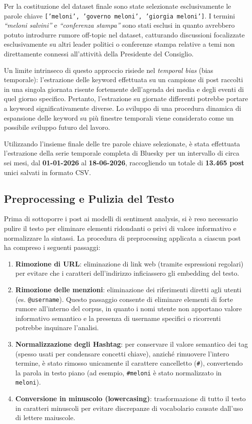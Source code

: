\documentclass[11pt]{article}
\begin{document}
Per la costituzione del dataset finale sono state selezionate esclusivamente le parole chiave \texttt{['meloni', 'governo meloni', 'giorgia meloni']}. I termini \textit{``meloni salvini''} e \textit{``conferenza stampa''} sono stati esclusi in quanto avrebbero potuto introdurre rumore off-topic nel dataset, catturando discussioni focalizzate esclusivamente su altri leader politici o conferenze stampa relative a temi non direttamente connessi all'attività della Presidente del Consiglio.

Un limite intrinseco di questo approccio risiede nel \textit{temporal bias} (bias temporale): l'estrazione delle keyword effettuata su un campione di post raccolti in una singola giornata risente fortemente dell'agenda dei media e degli eventi di quel giorno specifico. Pertanto, l'estrazione su giornate differenti potrebbe portare a keyword significativamente diverse. Lo sviluppo di una procedura dinamica di espansione delle keyword su più finestre temporali viene considerato come un possibile sviluppo futuro del lavoro.

Utilizzando l'insieme finale delle tre parole chiave selezionate, è stata effettuata l'estrazione della serie temporale completa di Bluesky per un intervallo di circa sei mesi, dal \textbf{01-01-2026} al \textbf{18-06-2026}, raccogliendo un totale di \textbf{13.465 post} unici salvati in formato CSV.

\subsection{Preprocessing e Pulizia del Testo}
\label{sec:preprocessing}
Prima di sottoporre i post ai modelli di sentiment analysis, si è reso necessario pulire il testo per eliminare elementi ridondanti o privi di valore informativo e normalizzare la sintassi. La procedura di preprocessing applicata a ciascun post ha compreso i seguenti passaggi:
\begin{enumerate}
    \item \textbf{Rimozione di URL}: eliminazione di link web (tramite espressioni regolari) per evitare che i caratteri dell'indirizzo inficiassero gli embedding del testo.
    \item \textbf{Rimozione delle menzioni}: eliminazione dei riferimenti diretti agli utenti (es. \texttt{@username}). Questo passaggio consente di eliminare elementi di forte rumore all'interno del corpus, in quanto i nomi utente non apportano valore informativo semantico e la presenza di username specifici o ricorrenti potrebbe inquinare l'analisi.
    \item \textbf{Normalizzazione degli Hashtag}: per conservare il valore semantico dei tag (spesso usati per condensare concetti chiave), anziché rimuovere l'intero termine, è stato rimosso unicamente il carattere cancelletto (\texttt{\#}), convertendo la parola in testo piano (ad esempio, \texttt{\#meloni} è stato normalizzato in \texttt{meloni}).
    \item \textbf{Conversione in minuscolo (lowercasing)}: trasformazione di tutto il testo in caratteri minuscoli per evitare discrepanze di vocabolario causate dall'uso di lettere maiuscole.
\end{enumerate}
\end{document}
